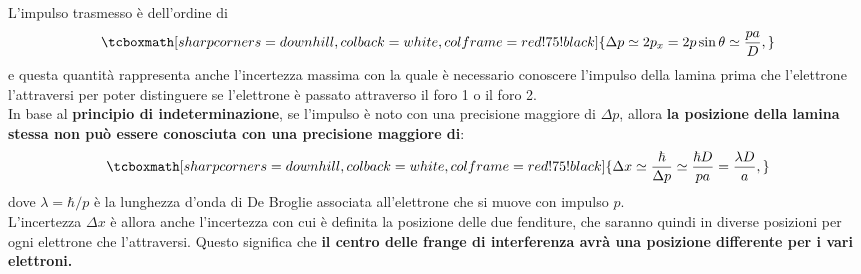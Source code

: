 L'impulso trasmesso è dell'ordine di
	\begin{equation}
		\tcboxmath[sharp corners=downhill ,colback=white,colframe=red!75!black]{
		\Delta p \simeq 2p_x = 2p \sin \theta \simeq \frac{pa}{D},
		}
	\end{equation}
e questa quantità rappresenta anche l'incertezza massima con la quale è necessario conoscere l'impulso della lamina prima che l'elettrone l'attraversi per poter distinguere se l'elettrone è passato attraverso il foro 1 o il foro 2.\\
In base al \textbf{principio di indeterminazione}, se l'impulso è noto con una precisione maggiore di $\Delta  p$, allora \textbf{la posizione della lamina stessa non può essere conosciuta con una precisione maggiore di}:
	\begin{equation}
		\tcboxmath[sharp corners=downhill ,colback=white,colframe=red!75!black]{
		\Delta x \simeq \frac{\hbar}{\Delta p} \simeq \frac{\hbar D}{pa}= \frac{\lambda D}{a},
		}
	\end{equation}
dove $\lambda = \hbar / p$ è la lunghezza d'onda di De Broglie associata all'elettrone che si muove con impulso $p$.\\

L'incertezza $\Delta x$ è allora anche l'incertezza con cui è definita la posizione delle due fenditure, che saranno quindi in diverse posizioni per ogni elettrone che l'attraversi. Questo significa che \textbf{il centro delle frange di interferenza avrà una posizione differente per i vari elettroni.}\\

